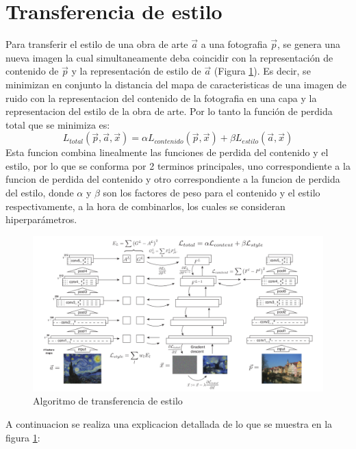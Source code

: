 \documentclass[a4paper,11pt,spanish]{book}
\begin{document}
    \section{Transferencia de estilo}
      Para transferir el estilo de una obra de arte $\overrightarrow{a}$ a una fotografia $\overrightarrow{p}$, se genera una nueva imagen
      la cual simultaneamente deba coincidir con la representación de contenido de $\overrightarrow{p}$ y la representación de estilo de $\overrightarrow{a}$ (Figura \ref{fig:gatys_generacion}). 
      Es decir, se minimizan en conjunto la distancia del mapa de caracteristicas de una imagen de ruido con la representacion del contenido de la fotografia
      en una capa y la representacion del estilo de la obra de arte. Por lo tanto la función de perdida total que se minimiza es:
      \begin{equation}\label{eq:objetivo}
       L_{total}(\overrightarrow{p},\overrightarrow{a},\overrightarrow{x}) = \alpha L_{contenido}(\overrightarrow{p},\overrightarrow{x}) + \beta L_{estilo}(\overrightarrow{a},\overrightarrow{x})
      \end{equation}
      Esta funcion combina linealmente las funciones de perdida del contenido y el estilo, por lo que se conforma por 2 terminos principales, uno correspondiente a la funcion de perdida
      del contenido y otro correspondiente a la funcion de perdida del estilo, donde $\alpha$ y $\beta$ son los factores de peso para el contenido y el estilo respectivamente,
      a la hora de combinarlos, los cuales se consideran hiperparámetros. 
      
      \begin{figure}[h]
	\includegraphics[width=\textwidth]{./img/gatys_method.png}
	\caption{Algoritmo de transferencia de estilo}
	\label{fig:gatys_generacion}
      \end{figure}
      A continuacion se realiza una explicacion detallada de lo que se muestra en la figura \ref{fig:gatys_generacion}:
      
\end{document}
